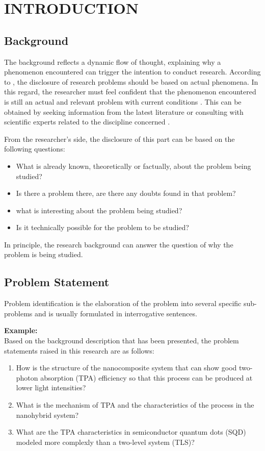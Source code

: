 \chapter{INTRODUCTION}

\section{Background}
The background reflects a dynamic flow of thought, explaining why a phenomenon encountered can trigger the intention to conduct research. According to \textcite{dewi2022}, the disclosure of research problems should be based on actual phenomena. In this regard, the researcher must feel confident that the phenomenon encountered is still an actual and relevant problem with current conditions \parencite{farhati2022}. This can be obtained by seeking information from the latest literature or consulting with scientific experts related to the discipline concerned \parencite{mallios2010}.

From the researcher's side, the disclosure of this part can be based on the following questions:
\begin{itemize}
    \item What is already known, theoretically or factually, about the problem being studied?
    \item Is there a problem there, are there any doubts found in that problem?
    \item what is interesting about the problem being studied?
    \item Is it technically possible for the problem to be studied?
\end{itemize}
In principle, the research background can answer the question of why the problem is being studied.

\section{Problem Statement}
Problem identification is the elaboration of the problem into several specific sub-problems and is usually formulated in interrogative sentences.

\textbf{Example:} \\
Based on the background description that has been presented, the problem statements raised in this research are as follows:
\begin{enumerate}
    \item How is the structure of the nanocomposite system that can show good two-photon absorption (TPA) efficiency so that this process can be produced at lower light intensities?
    \item What is the mechanism of TPA and the characteristics of the process in the nanohybrid system?
    \item What are the TPA characteristics in semiconductor quantum dots (SQD) modeled more complexly than a two-level system (TLS)?
\end{enumerate}

